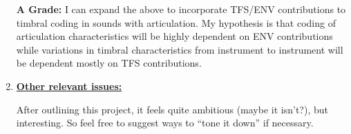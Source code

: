 \documentclass[9pt]{article}
\begin{document}
\begin{enumerate}
\textbf{A Grade: }I can expand the above to incorporate TFS/ENV contributions to timbral coding in sounds with articulation. My hypothesis is that coding of articulation characteristics will be highly dependent on ENV contributions while variations in timbral characteristics from instrument to instrument will be dependent mostly on TFS contributions.

\item \textbf{\underline{Other relevant issues: }}

After outlining this project, it feels quite ambitious (maybe it isn't?), but interesting. So feel free to suggest ways to ``tone it down'' if necessary. 
\end{enumerate}
\end{document}
